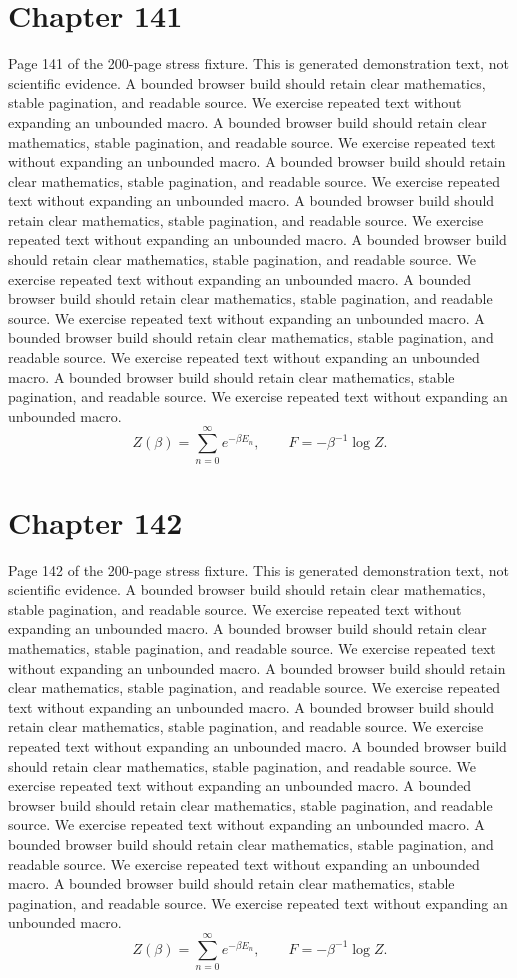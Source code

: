 \documentclass[11pt]{article}
\begin{document}
\section*{Chapter 141}
Page 141 of the 200-page stress fixture. This is generated demonstration text, not scientific evidence.
A bounded browser build should retain clear mathematics, stable pagination, and readable source. We exercise repeated text without expanding an unbounded macro.
A bounded browser build should retain clear mathematics, stable pagination, and readable source. We exercise repeated text without expanding an unbounded macro.
A bounded browser build should retain clear mathematics, stable pagination, and readable source. We exercise repeated text without expanding an unbounded macro.
A bounded browser build should retain clear mathematics, stable pagination, and readable source. We exercise repeated text without expanding an unbounded macro.
A bounded browser build should retain clear mathematics, stable pagination, and readable source. We exercise repeated text without expanding an unbounded macro.
A bounded browser build should retain clear mathematics, stable pagination, and readable source. We exercise repeated text without expanding an unbounded macro.
A bounded browser build should retain clear mathematics, stable pagination, and readable source. We exercise repeated text without expanding an unbounded macro.
A bounded browser build should retain clear mathematics, stable pagination, and readable source. We exercise repeated text without expanding an unbounded macro.
\[Z(\beta)=\sum_{n=0}^{\infty}e^{-\beta E_n},\qquad F=-\beta^{-1}\log Z.\]
\newpage
\section*{Chapter 142}
Page 142 of the 200-page stress fixture. This is generated demonstration text, not scientific evidence.
A bounded browser build should retain clear mathematics, stable pagination, and readable source. We exercise repeated text without expanding an unbounded macro.
A bounded browser build should retain clear mathematics, stable pagination, and readable source. We exercise repeated text without expanding an unbounded macro.
A bounded browser build should retain clear mathematics, stable pagination, and readable source. We exercise repeated text without expanding an unbounded macro.
A bounded browser build should retain clear mathematics, stable pagination, and readable source. We exercise repeated text without expanding an unbounded macro.
A bounded browser build should retain clear mathematics, stable pagination, and readable source. We exercise repeated text without expanding an unbounded macro.
A bounded browser build should retain clear mathematics, stable pagination, and readable source. We exercise repeated text without expanding an unbounded macro.
A bounded browser build should retain clear mathematics, stable pagination, and readable source. We exercise repeated text without expanding an unbounded macro.
A bounded browser build should retain clear mathematics, stable pagination, and readable source. We exercise repeated text without expanding an unbounded macro.
\[Z(\beta)=\sum_{n=0}^{\infty}e^{-\beta E_n},\qquad F=-\beta^{-1}\log Z.\]
\newpage
\end{document}
